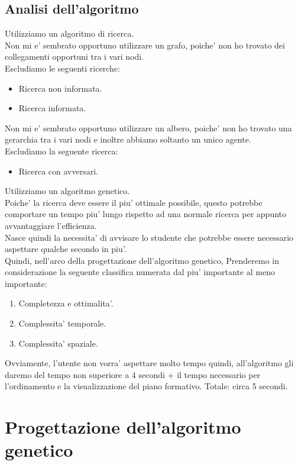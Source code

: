 \documentclass[10pt,a4paper]{article}
\begin{document}
    \subsection{Analisi dell'algoritmo}
      \label{analisiDellAlgoritmoSubsection}
      Utilizziamo un algoritmo di ricerca.\\
      Non mi e' sembrato opportuno utilizzare un grafo, poiche' non ho trovato dei collegamenti opportuni 
      tra i vari nodi.\\
      Escludiamo le seguenti ricerche:
      \begin{itemize}
        \item Ricerca non informata.
        \item Ricerca informata.
      \end{itemize}
      Non mi e' sembrato opportuno utilizzare un albero, poiche' non ho trovato una gerarchia tra i vari nodi e 
      inoltre abbiamo soltanto un unico agente.\\
      Escludiamo la seguente ricerca:
      \begin{itemize}
        \item Ricerca con avversari.
      \end{itemize}
      Utilizziamo un algoritmo genetico.\\
      Poiche' la ricerca deve essere il piu' ottimale possibile, questo 
      potrebbe comportare un tempo piu' lungo rispetto ad una normale ricerca per appunto avvantaggiare l'efficienza.\\
      Nasce quindi la necessita' di avvisare lo studente che potrebbe essere necessario aspettare qualche secondo in piu'.\\
      Quindi, nell'arco della progettazione dell'algoritmo genetico, Prenderemo in considerazione la 
      seguente classifica numerata dal piu' importante al meno importante:
      \begin{enumerate}
        \item Completezza e ottimalita'.
        \item Complessita' temporale.
        \item Complessita' spaziale.
      \end{enumerate}
      Ovviamente, l'utente non vorra' aspettare molto tempo quindi, all'algoritmo gli daremo del tempo 
      non superiore a 4 secondi + il tempo necessario per l'ordinamento e la visualizzazione del piano formativo. Totale: circa 5 secondi.
        
  \section{Progettazione dell'algoritmo genetico}
    \label{progettazioneDellAlgoritmoGeneticoSection}
    
\end{document}
